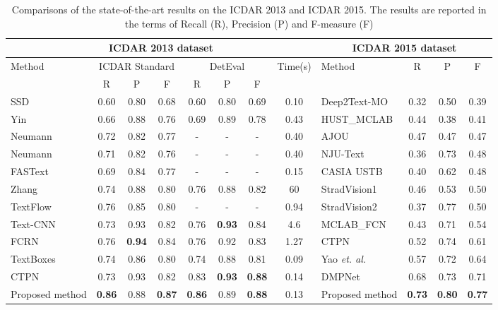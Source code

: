 \documentclass[10pt,twocolumn,letterpaper]{article}
\begin{document}
\begin{table*}[!t]
\centering
\caption{Comparisons of the state-of-the-art results on the ICDAR 2013 and ICDAR 2015. The results are reported in the terms of Recall (R), Precision (P) and F-measure (F)}
\begin{tabular}{|l|c|c|c|c|c|c|c||l|c|c|c|}
\hline
\multicolumn{8}{|c|}{ICDAR 2013 dataset} & \multicolumn{4}{|c|}{ICDAR 2015 dataset}
\\
\hline
\multirow{2}{*}{Method} & \multicolumn{3}{c|}{ICDAR Standard} & \multicolumn{3}{c|}{DetEval} & \multirow{2}{*}{Time(s)} & \multirow{2}{*}{Method} & \multirow{2}{*}{R} & \multirow{2}{*}{P} & \multirow{2}{*}{F} \\ \cline{2-7}
                        & R  & P  & F & R & P & F &  & & & &                        \\ \hline
SSD~\cite{liu2016SSD} & 0.60 & 0.80  & 0.68 &  0.60 & 0.80  & 0.69 & 0.10 & Deep2Text-MO & 0.32 & 0.50 & 0.39\\
Yin~\cite{Yin2014}  & 0.66 &0.88  & 0.76 & 0.69& 0.89&  0.78&  0.43 &  HUST\_MCLAB & 0.44 & 0.38 & 0.41\\
Neumann~\cite{Neumann2015b}  & 0.72& 0.82 & 0.77 & -  & - & -& 0.40 & AJOU & 0.47 & 0.47  & 0.47\\
Neumann~\cite{Neumann2015}  & 0.71 & 0.82 & 0.76 & -  & - & -& 0.40 & NJU-Text & 0.36 & 0.73  & 0.48\\
FASText~\cite{Busta2015}  & 0.69 & 0.84 & 0.77& -  & - & -& 0.15 & CASIA USTB & 0.40 & 0.62  & 0.48  \\
Zhang~\cite{Zhang2015}  & 0.74 & 0.88  & 0.80 &0.76  & 0.88 & 0.82 & 60 & StradVision1 & 0.46 & 0.53  & 0.50 \\
TextFlow~\cite{Tian2015}  & 0.76 & 0.85  & 0.80 &- &-&- & 0.94 & StradVision2 &  0.37 & 0.77  & 0.50 \\
Text-CNN~\cite{He2016}  & 0.73 &0.93  & 0.82 & 0.76& \textbf{0.93} & 0.84 & 4.6 & MCLAB\_FCN~\cite{Zhang2016} & 0.43 & 0.71  & 0.54   \\
FCRN~\cite{Gupta2016} & 0.76 & \textbf{0.94}  & 0.84 & 0.76 & 0.92  & 0.83 & 1.27 & CTPN~\cite{Tian2016} & 0.52 & 0.74 & 0.61 \\
TextBoxes~\cite{Liao2017} & 0.74 & 0.86 & 0.80 & 0.74 & 0.88 & 0.81 & 0.09 & Yao \textit{et. al.}\cite{Yao2016} & 0.57 & 0.72 & 0.64 \\
CTPN~\cite{Tian2016} & 0.73 & 0.93 & 0.82 & 0.83 & \textbf{0.93} & \textbf{0.88}& 0.14 & DMPNet~\cite{Liu2017} & 0.68 & 0.73 & 0.71\\
\hline
\hline
Proposed method  & \textbf{0.86} & 0.88 &  \textbf{0.87} & \textbf{0.86} & 0.89 & \textbf{0.88} &  0.13 & Proposed method  & \textbf{0.73} & \textbf{0.80} & \textbf{0.77} \\  \hline
\end{tabular}
\label{tab:icdar}
\end{table*}
\end{document}
